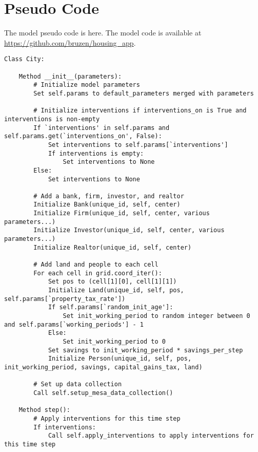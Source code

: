 \chapter{Pseudo Code} \label{appendix-pseudocode}

{\tiny The model pseudo code is here. The model code is available at \url{https://github.com/bruzen/housing\_app}.}
{\tiny\begin{verbatim} 
Class City:

    Method __init__(parameters):
        # Initialize model parameters
        Set self.params to default_parameters merged with parameters

        # Initialize interventions if interventions_on is True and interventions is non-empty
        If `interventions' in self.params and self.params.get(`interventions_on', False):
            Set interventions to self.params[`interventions']
            If interventions is empty:
                Set interventions to None
        Else:
            Set interventions to None

        # Add a bank, firm, investor, and realtor
        Initialize Bank(unique_id, self, center)
        Initialize Firm(unique_id, self, center, various parameters...)
        Initialize Investor(unique_id, self, center, various parameters...)
        Initialize Realtor(unique_id, self, center)

        # Add land and people to each cell
        For each cell in grid.coord_iter():
            Set pos to (cell[1][0], cell[1][1])
            Initialize Land(unique_id, self, pos, self.params[`property_tax_rate'])
            If self.params[`random_init_age']:
                Set init_working_period to random integer between 0 and self.params[`working_periods'] - 1
            Else:
                Set init_working_period to 0
            Set savings to init_working_period * savings_per_step
            Initialize Person(unique_id, self, pos, init_working_period, savings, capital_gains_tax, land)

        # Set up data collection
        Call self.setup_mesa_data_collection()

    Method step():
        # Apply interventions for this time step
        If interventions:
            Call self.apply_interventions to apply interventions for this time step


\end{verbatim}}
